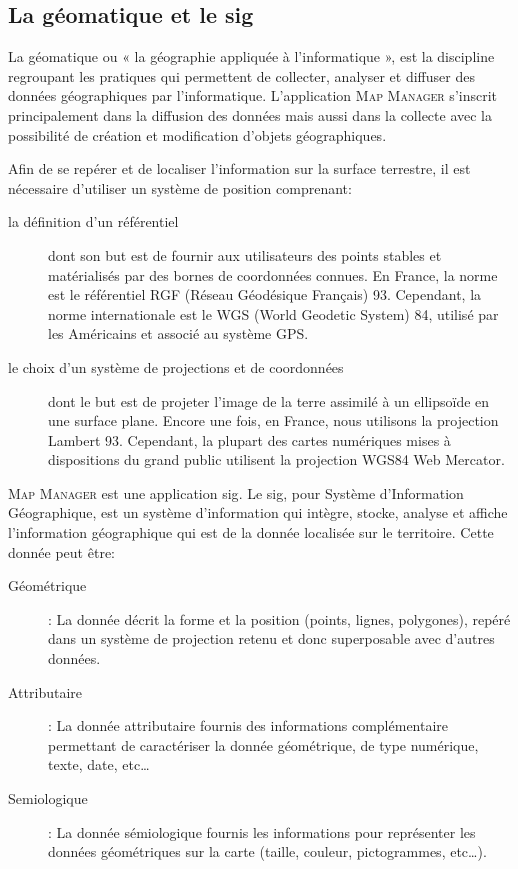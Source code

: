 \documentclass{rapportUHA40}
\begin{document}
\subsection{La géomatique et le \gls{sig}}
La géomatique ou « la géographie appliquée à l'informatique », est la
discipline regroupant les pratiques qui permettent de collecter, analyser et
diffuser des données géographiques par l'informatique. L'application
\textsc{Map Manager} s'inscrit principalement dans la diffusion des données
mais aussi dans la collecte avec la possibilité de création et modification
d'objets géographiques.

Afin de se repérer et de localiser l'information sur la surface terrestre, il
est nécessaire d'utiliser un système de position comprenant:
\begin{description}
  \item[la définition d'un référentiel] dont son but est de fournir aux utilisateurs
    des points stables et matérialisés par des bornes de coordonnées connues. En
    France, la norme est le référentiel RGF (Réseau Géodésique Français) 93.
    Cependant, la norme internationale est le WGS (World Geodetic System) 84,
    utilisé par les Américains et associé au système GPS\@.

  \item[le choix d'un système de projections et de coordonnées] dont le but est de
    projeter l'image de la terre assimilé à un ellipsoïde en une surface plane.
    Encore une fois, en France, nous utilisons la projection Lambert 93. Cependant,
    la plupart des cartes numériques mises à dispositions du grand public utilisent
    la projection WGS84 Web Mercator.
\end{description}


\textsc{Map Manager} est une application \gls{sig}. Le \gls{sig}, pour Système d'Information Géographique, est un système d’information
qui intègre, stocke, analyse et affiche l'information géographique qui est de
la donnée localisée sur le territoire. Cette donnée peut être:
\begin{description}
  \item[Géométrique]: La donnée décrit la forme et la position (points, lignes,
  polygones), repéré dans un système de projection retenu et donc superposable
  avec d'autres données.
  \item[Attributaire]: La donnée attributaire fournis des informations complémentaire
  permettant de caractériser la donnée géométrique, de type numérique, texte,
  date, etc\ldots
  \item[Semiologique]: La donnée sémiologique fournis les informations pour représenter
  les données géométriques sur la carte (taille, couleur, pictogrammes,
  etc\ldots).
\end{description}
\end{document}
